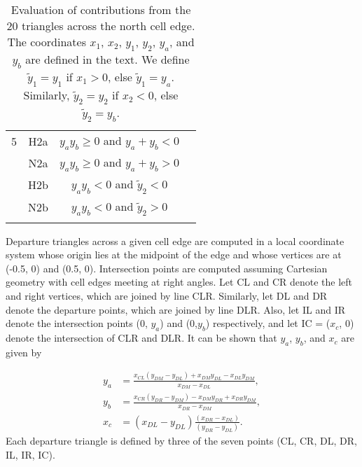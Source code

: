 \begin{table}
\begin{center}
\begin{tabular}{cccc}
5         &    H2a     &  $y_a y_b\geq 0$ and $y_a+y_b<0$      \\
          &    N2a     &  $y_a y_b\geq 0$ and $y_a+y_b>0$      \\
          &    H2b     &  $y_a y_b<0$ and $\tilde{y}_2<0$      \\
          &    N2b     &  $y_a y_b<0$ and $\tilde{y}_2>0$      \\
          &            &                                       \\
\hline
\end{tabular}
\caption{\label{table:triangles} Evaluation of contributions from the 20 triangles across
the north cell edge.  The coordinates $x_1$, $x_2$, $y_1$, $y_2$,
$y_a$, and $y_b$ are defined in the text. We define $\tilde{y}_1 =
y_1$ if $x_1>0$, else $\tilde{y}_1 = y_a$. Similarly, $\tilde{y}_2
= y_2$ if $x_2<0$, else $\tilde{y}_2 = y_b$.}
\end{center}
\end{table}


Departure triangles across a given cell edge are computed in a local coordinate system whose origin 
lies at the midpoint of the edge and whose vertices are at (-0.5, 0) and (0.5, 0).  
Intersection points are computed assuming Cartesian geometry with cell edges meeting at right angles.  
Let CL and CR denote the left and right vertices, which are joined by line CLR.   
Similarly, let DL and DR denote the departure points, which are joined by line DLR.  
Also, let IL and IR denote the intersection points (0, $y_a$) and (0,$y_b$) respectively, and 
let IC = ($x_c$, 0) denote the intersection of CLR and DLR.  
It can be shown that $y_a$, $y_b$, and $x_c$ are given by

\begin{equation}
  \begin{aligned}
    y_a &= \frac {{x_{CL} (y_{DM}-y_{DL}) + x_{DM}y_{DL} - x_{DL}y_{DM}}} {x_{DM} - x_{DL}}, \\
    y_b &= \frac {{x_{CR} (y_{DR}-y_{DM}) - x_{DM}y_{DR} + x_{DR}y_{DM}}} {x_{DR} - x_{DM}}, \\
    x_c &= (x_{DL} - y_{DL}) \frac{(x_{DR} - x_{DL})} {(y_{DR} - y_{DL})}.
  \end{aligned}
\end{equation}
Each departure triangle is defined by three of the seven points (CL, CR, DL, DR, IL, IR, IC).



